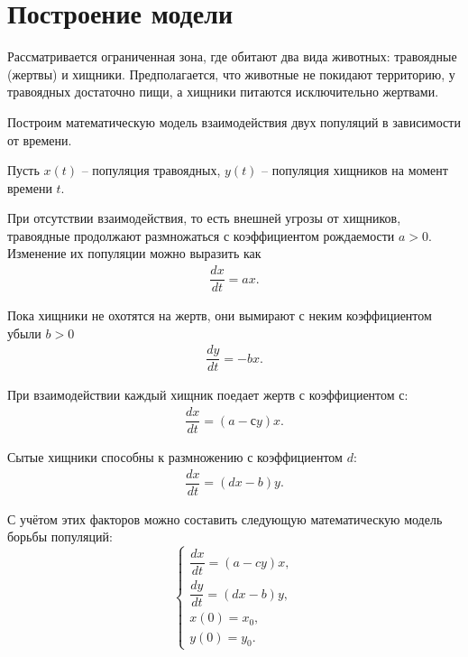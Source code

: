 \pagebreak

\section{Построение модели}
	Рассматривается ограниченная зона, где обитают два вида животных: травоядные (жертвы) и хищники. Предполагается, что животные не покидают территорию, у травоядных достаточно пищи, а хищники питаются исключительно жертвами.

	Построим математическую модель взаимодействия двух популяций в зависимости от времени. 

	Пусть \( x(t) \) -- популяция травоядных, \( y(t) \) -- популяция хищников на момент времени \( t \). 

	При отсутствии взаимодействия, то есть внешней угрозы от хищников, травоядные продолжают размножаться с коэффициентом рождаемости \( a > 0 \). Изменение их популяции можно выразить как
	\begin{align*}
		\dfrac{dx}{dt} = ax.
	\end{align*}

	Пока хищники не охотятся на жертв, они вымирают с неким коэффициентом убыли \( b > 0 \)
	\begin{align*}
		\dfrac{dy}{dt} = -bx.
	\end{align*}

	При взаимодействии каждый хищник поедает жертв с коэффициентом \( с \):
	\begin{align*}
		\dfrac{dx}{dt} = (a - сy)x.
	\end{align*}

	Сытые хищники способны к размножению с коэффициентом \( d \):
	\begin{align*}
		\dfrac{dx}{dt} = (dx - b)y.
	\end{align*}


	С учётом этих факторов можно составить следующую математическую модель борьбы популяций:
	\begin{equation}
		\begin{cases}
			\dfrac{dx}{dt} = (a - cy)x, \\
			\dfrac{dy}{dt} = (dx - b)y, \\
			x(0) = x_0, \\
			y(0) = y_0.
		\end{cases}
	\end{equation}


\pagebreak